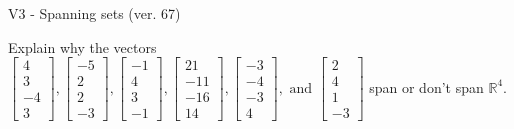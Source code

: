 \begin{exercise}
  \begin{exerciseTitle}V3 - Spanning sets (ver. 67)\end{exerciseTitle}
  \begin{exerciseStatement}
    Explain why the vectors \(\left[\begin{array}{r}
4 \\
3 \\
-4 \\
3
\end{array}\right] , \left[\begin{array}{r}
-5 \\
2 \\
2 \\
-3
\end{array}\right] , \left[\begin{array}{r}
-1 \\
4 \\
3 \\
-1
\end{array}\right] , \left[\begin{array}{r}
21 \\
-11 \\
-16 \\
14
\end{array}\right] , \left[\begin{array}{r}
-3 \\
-4 \\
-3 \\
4
\end{array}\right] , \text{ and } \left[\begin{array}{r}
2 \\
4 \\
1 \\
-3
\end{array}\right]\) span or don't span \(\mathbb{R}^4\). 
	



\end{exerciseStatement}
\end{exercise}
